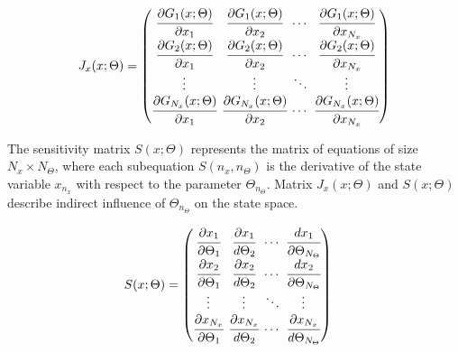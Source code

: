 \documentclass[../Article_Sensitivity_Analsysis.tex]{subfiles}
\begin{document}
	{\footnotesize
		\begin{align}
			\begingroup %
			\setlength\arraycolsep{2pt}
			{J_x}(x;\Theta)=\begin{pmatrix}
				\cfrac{\partial {G_{1}}(x;\Theta)}{\partial {x_{1}}} & \cfrac{\partial {G_{1}}(x;\Theta)}{\partial {x_{2}}} & \cdots & \cfrac{\partial {G_{1}}(x;\Theta)}{\partial {x_{N_x}}}\\
				\cfrac{\partial {G_{2}}(x;\Theta)}{\partial {x_{1}}} & \cfrac{\partial {G_{2}}(x;\Theta)}{\partial {x_{2}}} & \cdots & \cfrac{\partial {G_{2}}(x;\Theta)}{\partial {x_{N_x}}}\\
				\vdots & \vdots & \ddots & \vdots\\ 
				\cfrac{\partial {G_{N_x}}(x;\Theta)}{\partial {x_{1}}} & \cfrac{\partial {G_{N_x}}(x;\Theta)}{\partial {x_{2}}} & \cdots & \cfrac{\partial {G_{N_x}}(x;\Theta)}{\partial {x_{N_x}}}\\
			\end{pmatrix}
			\endgroup
	\end{align} }
	
	The sensitivity matrix $S(x;\Theta)$ represents the matrix of equations of size $N_x \times N_\Theta$, where each subequation $S(n_x,n_\Theta)$ is the derivative of the state variable $x_{n_x}$ with respect to the parameter $\Theta_{n_\Theta}$. Matrix ${J_x}(x;\Theta)$ and $S(x;\Theta)$ describe indirect influence of $\Theta_{n_\Theta}$ on the state space.
	
	{\footnotesize
		\begin{equation}
			\begin{split}
				S(x;\Theta) & = 
				\begingroup %
				\setlength\arraycolsep{2pt}
				\begin{pmatrix}
					\cfrac{\partial {x_{1}}}{\partial {\Theta_{1}}} 	& \cfrac{\partial {x_{1}}}{d {\Theta_{2}}}     & \cdots & \cfrac{d {x_{1}}}{\partial {\Theta_{N_\Theta}}}\\
					\cfrac{\partial {x_{2}}}{\partial {\Theta_{1}}} 	& \cfrac{\partial {x_{2}}}{d {\Theta_{2}}}     & \cdots & \cfrac{d {x_{2}}}{\partial {\Theta_{N_\Theta}}}\\
					\vdots					 	    & \vdots 					   	  & \ddots & \vdots\\
					\cfrac{\partial {x_{N_x}}}{\partial {\Theta_{1}}} 	& \cfrac{\partial {x_{N_x}}}{d {\Theta_{2}}}     & \cdots & \cfrac{\partial {x_{N_x}}}{d {\Theta_{N_\Theta}}}
				\end{pmatrix} 
				\endgroup
			\end{split}
	\end{equation} }
	
\end{document}
